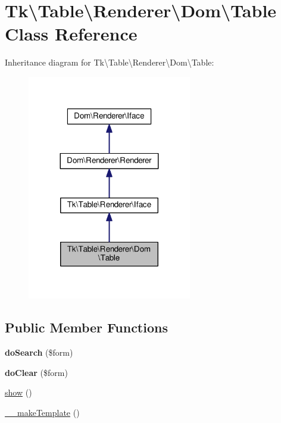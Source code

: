 \hypertarget{classTk_1_1Table_1_1Renderer_1_1Dom_1_1Table}{\section{Tk\textbackslash{}Table\textbackslash{}Renderer\textbackslash{}Dom\textbackslash{}Table Class Reference}
\label{classTk_1_1Table_1_1Renderer_1_1Dom_1_1Table}
}


Inheritance diagram for Tk\textbackslash{}Table\textbackslash{}Renderer\textbackslash{}Dom\textbackslash{}Table\+:\nopagebreak
\begin{figure}[H]
\begin{center}
\leavevmode
\includegraphics[width=203pt]{classTk_1_1Table_1_1Renderer_1_1Dom_1_1Table__inherit__graph}
\end{center}
\end{figure}
\subsection*{Public Member Functions}
\begin{DoxyCompactItemize}
\item 
\hypertarget{classTk_1_1Table_1_1Renderer_1_1Dom_1_1Table_a0d4498ac5c5e3b775ed43f0080eb91e7}{{\bfseries do\+Search} (\$form)}\label{classTk_1_1Table_1_1Renderer_1_1Dom_1_1Table_a0d4498ac5c5e3b775ed43f0080eb91e7}

\item 
\hypertarget{classTk_1_1Table_1_1Renderer_1_1Dom_1_1Table_acf829e288ccdf5712259545711cacb71}{{\bfseries do\+Clear} (\$form)}\label{classTk_1_1Table_1_1Renderer_1_1Dom_1_1Table_acf829e288ccdf5712259545711cacb71}

\item 
\hyperlink{classTk_1_1Table_1_1Renderer_1_1Dom_1_1Table_aeef7366176a250dbee759e9ff78062ee}{show} ()
\item 
\hyperlink{classTk_1_1Table_1_1Renderer_1_1Dom_1_1Table_af4105b8b0a48e41fbdfc232f44cbdea3}{\+\_\+\+\_\+make\+Template} ()
\end{DoxyCompactItemize}
